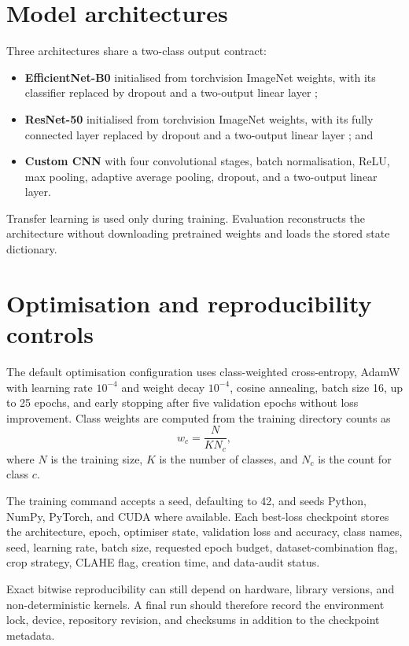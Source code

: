 \section{Model architectures}
Three architectures share a two-class output contract:

\begin{itemize}
    \item \textbf{EfficientNet-B0} initialised from torchvision ImageNet weights, with its classifier replaced by dropout and a two-output linear layer \citep{Tan2019};
    \item \textbf{ResNet-50} initialised from torchvision ImageNet weights, with its fully connected layer replaced by dropout and a two-output linear layer \citep{He2016}; and
    \item \textbf{Custom CNN} with four convolutional stages, batch normalisation, ReLU, max pooling, adaptive average pooling, dropout, and a two-output linear layer.
\end{itemize}

Transfer learning is used only during training. Evaluation reconstructs the architecture without downloading pretrained weights and loads the stored state dictionary.

\section{Optimisation and reproducibility controls}
The default optimisation configuration uses class-weighted cross-entropy, AdamW with learning rate $10^{-4}$ and weight decay $10^{-4}$, cosine annealing, batch size 16, up to 25 epochs, and early stopping after five validation epochs without loss improvement. Class weights are computed from the training directory counts as
\begin{equation}
w_c=\frac{N}{K N_c},
\end{equation}
where $N$ is the training size, $K$ is the number of classes, and $N_c$ is the count for class $c$.

The training command accepts a seed, defaulting to 42, and seeds Python, NumPy, PyTorch, and CUDA where available. Each best-loss checkpoint stores the architecture, epoch, optimiser state, validation loss and accuracy, class names, seed, learning rate, batch size, requested epoch budget, dataset-combination flag, crop strategy, CLAHE flag, creation time, and data-audit status.

Exact bitwise reproducibility can still depend on hardware, library versions, and non-deterministic kernels. A final run should therefore record the environment lock, device, repository revision, and checksums in addition to the checkpoint metadata.

